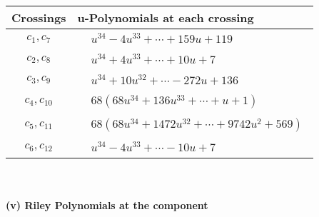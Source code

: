 \documentclass[1p]{elsarticle_modified}
\theoremstyle{definition}
\begin{document}
\begin{tabular}{m{50pt}|m{274pt}}
Crossings & \hspace{64pt}u-Polynomials at each crossing \\
\hline $$\begin{aligned}c_{1},c_{7}\end{aligned}$$&$\begin{aligned}
&u^{34}-4 u^{33}+\cdots+159 u+119
\end{aligned}$\\
\hline $$\begin{aligned}c_{2},c_{8}\end{aligned}$$&$\begin{aligned}
&u^{34}+4 u^{33}+\cdots+10 u+7
\end{aligned}$\\
\hline $$\begin{aligned}c_{3},c_{9}\end{aligned}$$&$\begin{aligned}
&u^{34}+10 u^{32}+\cdots-272 u+136
\end{aligned}$\\
\hline $$\begin{aligned}c_{4},c_{10}\end{aligned}$$&$\begin{aligned}
&68(68 u^{34}+136 u^{33}+\cdots+u+1)
\end{aligned}$\\
\hline $$\begin{aligned}c_{5},c_{11}\end{aligned}$$&$\begin{aligned}
&68(68 u^{34}+1472 u^{32}+\cdots+9742 u^2+569)
\end{aligned}$\\
\hline $$\begin{aligned}c_{6},c_{12}\end{aligned}$$&$\begin{aligned}
&u^{34}-4 u^{33}+\cdots-10 u+7
\end{aligned}$\\
\hline
\end{tabular}\\~\\
\newpage\renewcommand{\arraystretch}{1}
\flushleft \textbf{(v) Riley Polynomials at the component}\newline \\
\end{document}

